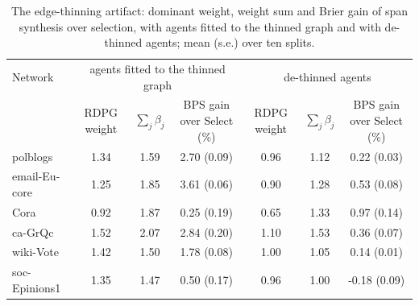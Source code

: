 \documentclass[12pt]{article}
\begin{document}
\begin{table}[ht]
\centering
\caption{The edge-thinning artifact: dominant weight, weight sum and Brier gain of span synthesis over selection, with agents fitted to the thinned graph and with de-thinned agents; mean (s.e.) over ten splits.}
\label{tab:thinning}
\begin{tabular}{lcccccc}
\toprule
Network & \multicolumn{3}{c}{agents fitted to the thinned graph} & \multicolumn{3}{c}{de-thinned agents} \\
 & RDPG weight & $\sum_j\beta_j$ & BPS gain over Select (\%) & RDPG weight & $\sum_j\beta_j$ & BPS gain over Select (\%) \\
\midrule
polblogs & 1.34 & 1.59 & 2.70 (0.09) & 0.96 & 1.12 & 0.22 (0.03) \\
email-Eu-core & 1.25 & 1.85 & 3.61 (0.06) & 0.90 & 1.28 & 0.53 (0.08) \\
Cora & 0.92 & 1.87 & 0.25 (0.19) & 0.65 & 1.33 & 0.97 (0.14) \\
ca-GrQc & 1.52 & 2.07 & 2.84 (0.20) & 1.10 & 1.53 & 0.36 (0.07) \\
wiki-Vote & 1.42 & 1.50 & 1.78 (0.08) & 1.00 & 1.05 & 0.14 (0.01) \\
soc-Epinions1 & 1.35 & 1.47 & 0.50 (0.17) & 0.96 & 1.00 & -0.18 (0.09) \\
\bottomrule
\end{tabular}

\end{table}
\end{document}
